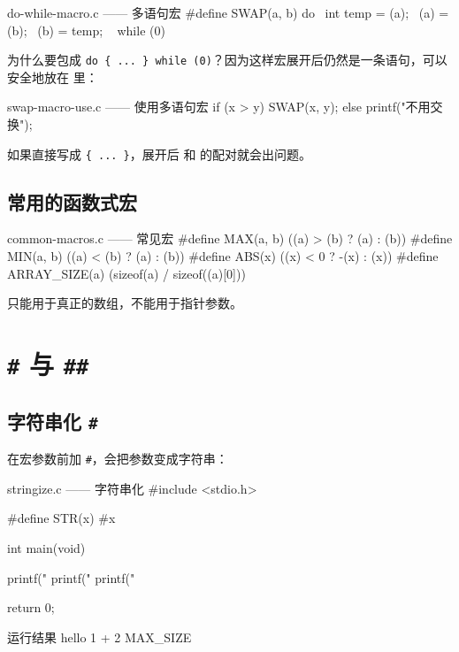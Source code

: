 \begin{codebox}{do-while-macro.c —— 多语句宏}
#define SWAP(a, b) do { \
    int temp = (a);     \
    (a) = (b);          \
    (b) = temp;         \
} while (0)
\end{codebox}

为什么要包成 \texttt{do \{ ... \} while (0)}？因为这样宏展开后仍然是一条语句，可以安全地放在  里：

\begin{codebox}{swap-macro-use.c —— 使用多语句宏}
if (x > y)
    SWAP(x, y);
else
    printf("不用交换\n");
\end{codebox}

如果直接写成 \texttt{\{ ... \}}，展开后  和  的配对就会出问题。

\subsection{常用的函数式宏}

\begin{codebox}{common-macros.c —— 常见宏}
#define MAX(a, b) ((a) > (b) ? (a) : (b))
#define MIN(a, b) ((a) < (b) ? (a) : (b))
#define ABS(x)    ((x) < 0 ? -(x) : (x))
#define ARRAY_SIZE(a) (sizeof(a) / sizeof((a)[0]))
\end{codebox}

\code{ARRAY_SIZE} 只能用于真正的数组，不能用于指针参数。

\section{\texttt{\#} 与 \texttt{\#\#}}

\subsection{字符串化 \texttt{\#}}

在宏参数前加 \texttt{\#}，会把参数变成字符串：

\begin{codebox}{stringize.c —— 字符串化}
#include <stdio.h>

#define STR(x) #x

int main(void)
{
    printf("%
    printf("%
    printf("%

    return 0;
}
\end{codebox}

\begin{outbox}{运行结果}
hello
1 + 2
MAX_SIZE
\end{outbox}

